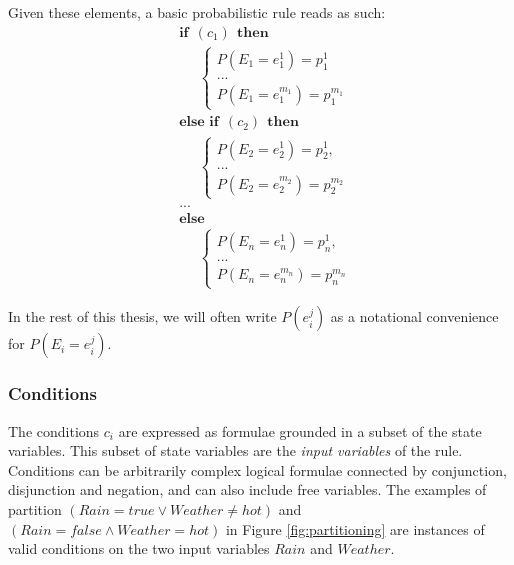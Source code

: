 Given these elements, a basic probabilistic rule reads as such:
\begin{equation}
\begin{aligned}
& \textbf{if} \ \ (c_{1}) \ \ \textbf{then} \\ 
& \;\;\;\;\; \begin{cases}
P(E_1\!=\!e_1^1) = p_1^1 \\
 ... \\
P(E_1\!=\!e_1^{m_1}) = p_1^{m_1} 
\end{cases} \\[3mm]
& \textbf{else if} \ \ (c_{2}) \ \ \textbf{then} \\ 
& \;\;\;\;\; \begin{cases}
P(E_2\!=\!e_2^1) = p_2^1, \\
 ... \\
P(E_2\!=\!e_2^{m_2}) = p_2^{m_2}
\end{cases} \\ 
& ...  \\
& \textbf{else} \\
& \;\;\;\;\; \begin{cases}
P(E_n\!=\!e_n^1) = p_n^1, \\
... \\
P(E_n\!=\!e_n^{m_n}) = p_n^{m_n}
\end{cases}
\end{aligned}
\label{eq:probrule}
\end{equation}

 In the rest of this thesis, we will often write $P(e_i^j)$ as a notational convenience for $P(E_i = e_i^j)$. 


\subsubsection*{Conditions}

The conditions $c_i$ are expressed as formulae grounded in a subset of the state variables. This subset of state variables are the \textit{input variables} of the rule. Conditions can be arbitrarily complex logical formulae connected by conjunction, disjunction and negation, and can also include free variables. The examples of partition  $(\mathit{Rain}\!=\mathit{true} \lor \mathit{Weather}\!\neq\mathit{hot})$ and $(\mathit{Rain}\!=\mathit{false} \land \mathit{Weather}\!=\mathit{hot})$ in Figure \ref{fig:partitioning} are instances of valid conditions on the two input variables $Rain$ and $\mathit{Weather}$. 

